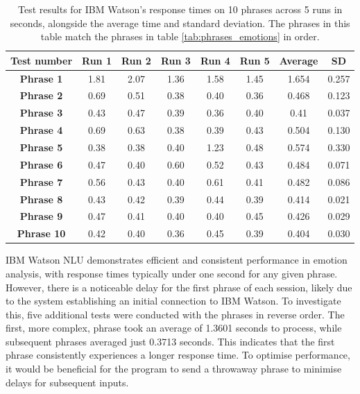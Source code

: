 \clearpage{}

\begin{table}[h!]
\centering{}
\caption{Test results for IBM Watson's response times on 10 phrases across 5 runs in seconds, alongside the average time and standard deviation. The phrases in this table match the phrases in table \ref{tab:phrases_emotions} in order.}
\begin{tabular}{|c|c|c|c|c|c|c|c|}
\hline
\textbf{Test number} & \textbf{Run 1} & \textbf{Run 2} & \textbf{Run 3} & \textbf{Run 4} & \textbf{Run 5} & \textbf{Average} & \textbf{SD} \\ \hline
\textbf{Phrase 1}    & 1.81 & 2.07 & 1.36 & 1.58 & 1.45 & 1.654 & 0.257        \\ \hline
\textbf{Phrase 2}    & 0.69 & 0.51 & 0.38 & 0.40 & 0.36 & 0.468 & 0.123        \\ \hline
\textbf{Phrase 3}    & 0.43 & 0.47 & 0.39 & 0.36 & 0.40 & 0.41 &  0.037       \\ \hline
\textbf{Phrase 4}    & 0.69 & 0.63 & 0.38 & 0.39 & 0.43 & 0.504 & 0.130        \\ \hline
\textbf{Phrase 5}    & 0.38 & 0.38 & 0.40 & 1.23 & 0.48 & 0.574 & 0.330        \\ \hline
\textbf{Phrase 6}    & 0.47 & 0.40 & 0.60 & 0.52 & 0.43 & 0.484 & 0.071        \\ \hline
\textbf{Phrase 7}    & 0.56 & 0.43 & 0.40 & 0.61 & 0.41 & 0.482 & 0.086        \\ \hline
\textbf{Phrase 8}    & 0.43 & 0.42 & 0.39 & 0.44 & 0.39 & 0.414 & 0.021        \\ \hline
\textbf{Phrase 9}    & 0.47 & 0.41 & 0.40 & 0.40 & 0.45 & 0.426 & 0.029        \\ \hline
\textbf{Phrase 10}   & 0.42 & 0.40 & 0.36 & 0.45 & 0.39 & 0.404 & 0.030        \\ \hline
\end{tabular}
\label{tab:phrase_tests}
\end{table}

IBM Watson NLU demonstrates efficient and consistent performance in emotion analysis, with response times typically under one second for any given phrase. However, there is a noticeable delay for the first phrase of each session, likely due to the system establishing an initial connection to IBM Watson. To investigate this, five additional tests were conducted with the phrases in reverse order. The first, more complex, phrase took an average of 1.3601 seconds to process, while subsequent phrases averaged just 0.3713 seconds. This indicates that the first phrase consistently experiences a longer response time. To optimise performance, it would be beneficial for the program to send a throwaway phrase to minimise delays for subsequent inputs.

